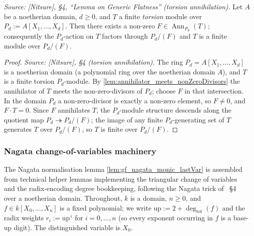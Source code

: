 \begin{lemma}
  \label{lem:gf_torsion_annihilator}
  \textit{Source: [Nitsure], \S4, ``Lemma on Generic Flatness'' (torsion annihilation).}
  Let \(A\) be a noetherian domain, \(d \ge 0\), and \(T\) a finite \emph{torsion} module
  over \(P_d := A[X_1, \dots, X_d]\). Then there exists a non-zero
  \(F \in \operatorname{Ann}_{P_d}(T)\); consequently the \(P_d\)-action on \(T\) factors
  through \(P_d/(F)\) and \(T\) is a finite module over \(P_d/(F)\).
\end{lemma}

\begin{proof}

\leanok
  \textit{Source: [Nitsure], \S4 (torsion annihilation).}
  The ring \(P_d = A[X_1, \dots, X_d]\) is a noetherian domain (a polynomial ring over the
  noetherian domain \(A\)), and \(T\) is a finite torsion \(P_d\)-module. By
  \cref{lem:annihilator_meets_nonZeroDivisors} the annihilator of \(T\) meets the
  non-zero-divisors of \(P_d\); choose \(F\) in that intersection. In the domain \(P_d\) a
  non-zero-divisor is exactly a non-zero element, so \(F \ne 0\), and \(F \cdot T = 0\).
  Since \(F\) annihilates \(T\), the \(P_d\)-module structure descends along the quotient
  map \(P_d \twoheadrightarrow P_d/(F)\); the image of any finite \(P_d\)-generating set of
  \(T\) generates \(T\) over \(P_d/(F)\), so \(T\) is finite over \(P_d/(F)\).
\end{proof}

\subsubsection{Nagata change-of-variables machinery}
\label{sec:gf_nagata_machinery}

The Nagata normalisation lemma \cref{lem:gf_nagata_monic_lastVar} is assembled from
technical helper lemmas implementing the triangular change of variables and the
radix-encoding degree bookkeeping, following the Nagata trick of
\cite{nitsure-hilbert-quot}~\S4 over a noetherian domain. Throughout, \(k\) is a domain,
\(n \ge 0\), and \(f \in k[X_0, \dots, X_n]\) is a fixed polynomial; we write
\(\mathrm{up} := 2 + \deg_{\mathrm{tot}}(f)\) and the radix weights \(r_i := \mathrm{up}^{\,i}\)
for \(i = 0, \dots, n\) (so every exponent occurring in \(f\) is a base-\(\mathrm{up}\) digit).
The distinguished variable is \(X_0\).

